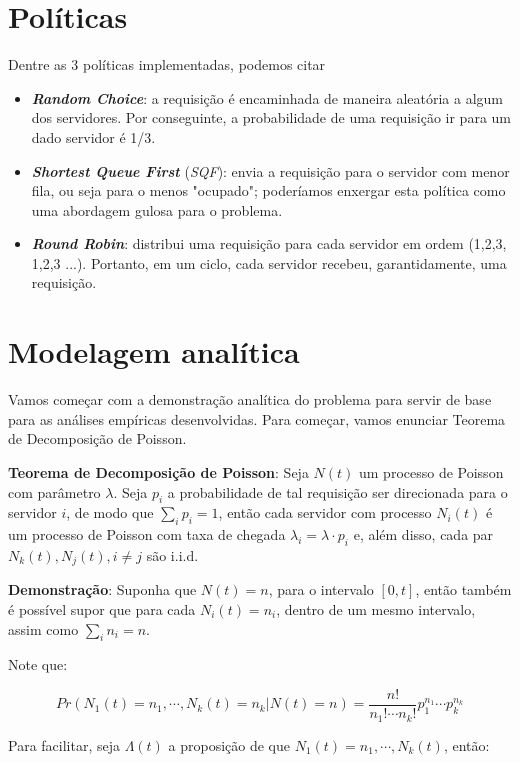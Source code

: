 \documentclass[conference]{IEEEtran}
\begin{document}
\section{Políticas}

\noindent Dentre as 3 políticas implementadas, podemos citar

\begin{itemize}
    \item \textbf{\textit{Random Choice}}: a requisição é encaminhada de maneira aleatória a algum dos servidores. Por conseguinte, a probabilidade de uma requisição ir para um dado servidor é 1/3. 
    \item \textbf{\textit{Shortest Queue First}} (\textit{SQF}): envia a requisição para o servidor com menor fila, ou seja para o menos "ocupado"; poderíamos enxergar esta política como uma abordagem gulosa para o problema.
    \item \textbf{\textit{Round Robin}}: distribui uma requisição para cada servidor em ordem (1,2,3, 1,2,3 ...). Portanto, em um ciclo, cada servidor recebeu, garantidamente, uma requisição.
\end{itemize}

\section{Modelagem analítica}

Vamos começar com a demonstração analítica do problema para servir de base para as análises empíricas desenvolvidas. Para começar, vamos enunciar Teorema de Decomposição de Poisson.

\textbf{Teorema de Decomposição de Poisson}: Seja $N(t)$ um processo de Poisson com parâmetro $\lambda$. Seja $p_i$ a probabilidade de tal requisição ser direcionada para o servidor $i$, de modo que $\sum_{i} p_i = 1$, então cada servidor com processo $N_i (t)$ é um processo de Poisson com taxa de chegada $\lambda_i = \lambda \cdot p_i$ e, além disso, cada par $N_k (t), N_j (t), i \neq j$ são i.i.d.

\textbf{Demonstração}: Suponha que $N(t) = n$, para o intervalo $[0, t]$, então também é possível supor que para cada $N_i(t) = n_i$, dentro de um mesmo intervalo, assim como $\sum_i n_i = n$.

Note que:

$$
Pr(N_1(t) = n_1, \cdots, N_k(t) = n_k | N(t) = n) = \frac{n!}{n_1!\cdots n_k!} p_1^{n_1} \cdots p_k^{n_k}
$$

Para facilitar, seja $\Lambda(t)$ a proposição de que $N_1(t) = n_1, \cdots, N_k(t)$, então:
\end{document}
